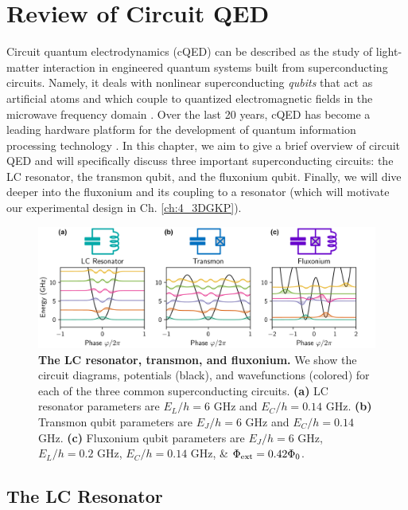 \chapter{Review of Circuit QED \label{ch:3_cQED}}

Circuit quantum electrodynamics (cQED) can be described as the study of light-matter interaction in engineered quantum systems built from superconducting circuits. Namely, it deals with nonlinear superconducting \textit{qubits} that act as artificial atoms and which couple to quantized electromagnetic fields in the microwave frequency domain \cite{blais2004cavity}. Over the last 20 years, cQED has become a leading hardware platform for the development of quantum information processing technology \cite{devoret2004superconducting, devoret2013superconducting, girvin2014circuit, krantz2019quantum, kjaergaard2020superconducting, blais2020quantum, blais2021circuit}. In this chapter, we aim to give a brief overview of circuit QED and will specifically discuss three important superconducting circuits: the LC resonator, the transmon qubit, and the fluxonium qubit. Finally, we will dive deeper into the fluxonium and its coupling to a resonator (which will motivate our experimental design in Ch. \ref{ch:4_3DGKP}). 

\begin{figure}[h]
    \centering
    \includegraphics[width=\linewidth]{Figures/3/Circuit_QED_Overview.pdf}
    \caption{\textbf{The LC resonator, transmon, and fluxonium.} We show the circuit diagrams, potentials (black), and wavefunctions (colored) for each of the three common superconducting circuits. \textbf{(a)} LC resonator parameters are $E_L/h = 6$ GHz and $E_C/h = 0.14$ GHz. \textbf{(b)} Transmon qubit parameters are $E_J/h = 6$ GHz and $E_C/h = 0.14$ GHz. \textbf{(c)} Fluxonium qubit parameters are $E_J/h = 6$ GHz,  $E_L/h = 0.2$ GHz, $E_C/h = 0.14$ GHz, \& $\Phi_{\rm ext} = 0.42\Phi_0$.}
    \label{fig:3_Circuit_QED_Overview}
\end{figure}
\clearpage

\section{The LC Resonator}

